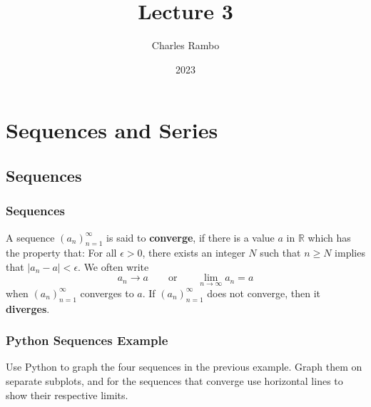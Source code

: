 \documentclass{beamer}
\title{Lecture 3}
\author{Charles Rambo}
\institute{UCLA Anderson School of Management}
\date{2023}
\begin{document}
\insertTitleSlide

\section{Sequences and Series}

\subsection{Sequences}

\begin{frame}
\frametitle{Sequences}
\begin{Definition}
A sequence $\displaystyle(a_n)_{n = 1}^\infty$ is said to {\bf converge}, if there is a value $a$ in $\mathbb{R}$ which has the property that: For all $\epsilon > 0$, there exists an integer $N$ such that $n\geq N$ implies that $|a_n - a| < \epsilon$.  We often write
$$
a_n\to a\qquad\text{or}\qquad\lim_{n\to\infty} a_n = a
$$
when $\displaystyle(a_n)_{n = 1}^\infty$ converges to $a$. If $\displaystyle(a_n)_{n = 1}^\infty$ does not converge, then it {\bf diverges}. 
\end{Definition}
\end{frame}


\begin{frame}[fragile]
\frametitle{Python Sequences Example}
\begin{Example}
Use Python to graph the four sequences in the previous example. Graph them on separate subplots, and for the sequences that converge use horizontal lines to show their respective limits.
\end{Example}

\end{frame}
\end{document}
